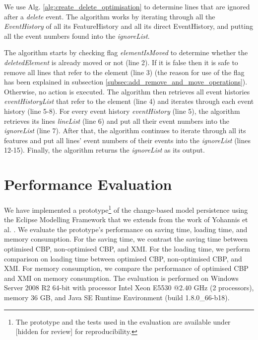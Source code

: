 \documentclass{llncs}
\begin{document}
We use Alg. \ref{alg:create_delete_optimisation} to determine lines that are ignored after a \emph{delete} event. The algorithm
works by iterating through all the \emph{EventHistory} of all its {FeatureHistory} and all its direct {EventHistory}, and putting all the event numbers found into the \emph{ignoreList}.

The algorithm starts by checking flag \emph{elementIsMoved} to determine whether the \emph{deletedElement} is already moved or not (line 2). If it is false then it is safe to remove all lines that refer to the element (line 3) (the reason for use of the flag has been explained in subsection \ref{subsec:add_remove_and_move_operations}). Otherwise, no action is executed. The algorithm then retrieves all event histories \emph{eventHistoryList} that refer to the element (line 4) and iterates through each event history (line 5-8). For every event history \emph{eventHistory} (line 5), the algorithm retrieves its lines \emph{lineList} (line 6) and put all their event numbers into the \emph{ignoreList} (line 7). After that, the algorithm continues to iterate through all its features and put all lines' event numbers of their events into the \emph{ignoreList} (lines 12-15). Finally, the algorithm returns the \emph{ignoreList} as its output.





\section{Performance Evaluation}
\label{sec:performance_evaluation}
We have implemented a prototype\footnote{The prototype and the tests used in the evaluation are available under [hidden for review] for reproducibility. %
} of the change-based model persistence using the Eclipse Modelling Framework that we extends from the work of Yohannis et al. \cite{yohannis2017turning}. We evaluate the prototype's performance on saving time, loading time, and memory consumption. For the saving time, we contrast the saving time between optimised CBP, non-optimised CBP, and XMI. For the loading time, we perform comparison on loading time between optimised CBP, non-optimised CBP, and XMI. For memory consumption, we compare the performance of optimised CBP and XMI on memory consumption. The evaluation is performed on Windows Server 2008 R2 64-bit with processor Intel Xeon E5530 @2.40 GHz (2 processors), memory 36 GB, and Java SE Runtime Environment (build 1.8.0\_66-b18).
\end{document}
